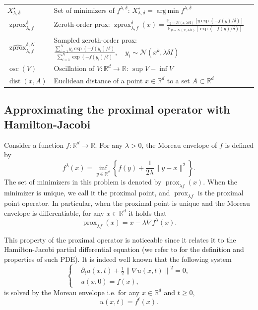 \documentclass{article}
\newcommand{\R}{\mathbb{R}}
\newcommand{\prox}{\ensuremath{\operatorname{prox}}}
\newcommand{\zprox}{\ensuremath{\operatorname{zprox}}}
\newcommand{\szprox}{\ensuremath{\widehat{\operatorname{zprox}}}}
\DeclareMathOperator*{\argmin}{arg\,min}
\begin{document}
\begin{table}[ht]
\begin{tabular}{@{}ll@{}}
\(X^\star_{\lambda,\delta}\) & Set of minimizers of \(f^{\lambda,\delta}\): \(X^\star_{\lambda,\delta}=\argmin f^{\lambda,\delta}\) \\
\(\zprox^\delta_{\lambda,f}\) & Zeroth-order prox: 
\(\displaystyle
\zprox^\delta_{\lambda,f}(x)
=
\frac{
\mathbb{E}_{y\sim\mathcal{N}(x,\lambda\delta I)}
\left[y\exp(-f(y)/\delta)\right]
}{
\mathbb{E}_{y\sim\mathcal{N}(x,\lambda\delta I)}
\left[\exp(-f(y)/\delta)\right]
}
\) \\
\(\szprox^{\delta,N}_{\lambda,f}\) & Sampled zeroth-order prox:
\(\displaystyle
\frac{
\sum_{i=1}^N y_i \exp(-f(y_i)/\delta)
}{
\sum_{i=1}^N \exp(-f(y_i)/\delta)
},\quad
y_i\sim\mathcal{N}(x^k,\lambda\delta I)
\) \\
\(\operatorname{osc}(V)\) & Oscillation of \(V:\R^d\to \R\): \(\sup V-\inf V\) \\
\(\operatorname{dist}(x,A)\) & Euclidean distance of a point \(x\in \R^d\) to a set \(A\subset \R^d\) \\
\bottomrule
\end{tabular}
\end{table}

\subsection{Approximating the proximal operator with Hamilton-Jacobi}\label{app:HamiltonJacobi}

Consider a function \(f:\R^d\to\R\). For any \(\lambda>0\), the Moreau envelope of \(f\) is defined by
\[
f^\lambda(x)=\inf_{y\in\mathbb R^d}
\left\{
f(y)+\frac{1}{2\lambda}\|y-x\|^2
\right\}.
\]
The set of minimizers in this problem is denoted by \(\prox_{\lambda f}(x)\). When the minimizer is unique, we call it the proximal point, and \(\prox_{\lambda f}\) is the proximal point operator. In particular, when the proximal point is unique and the Moreau envelope is differentiable, for any \(x\in\R^d\) it holds that
\begin{equation}\label{eq:prox_env}\prox_{\lambda f}(x)=x-\lambda\nabla f^\lambda(x).\end{equation}

This property of the proximal operator is noticeable since it relates it to the Hamilton-Jacobi partial differential equation (we refer to \cite[Chapter 10]{evans} for the definition and properties of such PDE). It is indeed well known that the following system
\begin{equation}\label{eq:HJ_intro}\tag{HJ}
    \left\{\begin{aligned}
        &\partial_t u(x,t) + \frac{1}{2}\left\|\nabla u(x,t)\right\|^2 = 0,\\
        &u(x,0)=f(x),
        \end{aligned}\right.
\end{equation}
is solved by the Moreau envelope i.e. for any \(x\in\R^d\) and \(t\ge0\), \[u(x,t)=f^t(x).\]
\end{document}
